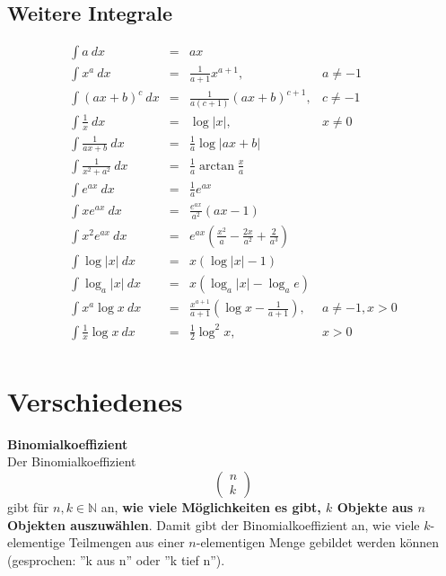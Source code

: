 \documentclass[10pt,a4paper,twocolumn]{article}
\begin{document}
\subsection{Weitere Integrale}
\[
\begin{array}{rcll}
\int a\ dx & = & ax & \\
\int x^a\ dx & = & \frac{1}{a+1} x^{a+1} , & a \neq -1 \\
\int (ax+b)^c\ dx & = & \frac{1}{a(c+1)}(ax+b)^{c+1}, & c \neq -1 \\
\int \frac{1}{x}\ dx & = & \log\left|x\right|, & x\neq 0 \\
\int \frac{1}{ax+b}\ dx & = & \frac{1}{a} \log\left|ax+b\right| & \\
\int \frac{1}{x^2+a^2}\ dx & = & \frac{1}{a}\arctan\frac{x}{a} & \\
%
%
\int e^{ax}\ dx & = & \frac{1}{a}e^{ax} & \\
\int x e^{ax}\ dx & = & \frac{e^{ax}}{a^2}(ax-1) & \\
\int x^2 e^{ax}\ dx & = & e^{ax}\left(\frac{x^2}{a}-\frac{2x}{a^2}+\frac{2}{a^3}\right) & \\
%
%
\int \log\left|x\right|\ dx & = & x(\log\left|x\right| - 1) & \\
\int \log_a\left|x\right|\ dx & = & x(\log_a\left|x\right|-\log_a e) & \\
\int x^a \log x\ dx & = & \frac{x^{a+1}}{a+1}\left(\log x - \frac{1}{a+1}\right), & a\neq-1,x>0 \\
\int \frac{1}{x}\log x\ dx & = & \frac{1}{2}\log^2 x, & x>0 \\
\end{array}
\]

\section{Verschiedenes}
\textbf{Binomialkoeffizient} \\
Der Binomialkoeffizient
\[
\left(
\begin{array}{c}
	n \\
	k
\end{array}
\right)
\]
gibt für $n,k\in\mathbb{N}$ an, \textbf{wie viele Möglichkeiten es gibt, $k$ Objekte aus $n$ Objekten auszuwählen}. Damit gibt der Binomialkoeffizient an, wie viele $k$-elementige Teilmengen aus einer $n$-elementigen Menge gebildet werden können (gesprochen: ''k aus n'' oder ''k tief n'').

\vspace{10pt}
\end{document}
